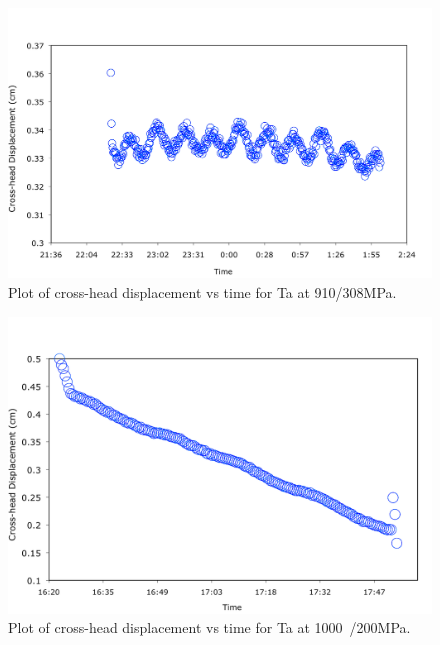 %
\begin{figure}[H]
\begin{center}
\includegraphics[width=14.2cm]{enginxsanta910C308MPa}
\vspace{-2mm}
\caption{Plot of cross-head displacement vs time for Ta at 910\celsius/308MPa.}
\label{fig:enginxsanta910C308MPa7}
\end{center}
\end{figure}  
%

%
\begin{figure}[H]
\begin{center}
\includegraphics[width=14cm]{enginxsanta1000C200MPa}
\vspace{-2mm}
\caption{Plot of cross-head displacement vs time for Ta at 1000\celsius\ /200MPa.}
\label{fig:enginxsanta1000C200MPa7}
\end{center}
\end{figure}  
%



